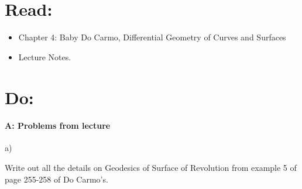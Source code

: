 \documentclass[12pt]{article}
\title{\rightline {\Huge {Due: December, 5}}}
\author{\LARGE {HMC\quad Math 142 \quad Fall 2017} 
\\ {Prof. Gu}  
\\ {\LARGE Problem Set 11}}
\date{Start this assignment before Sunday night!}
\begin{document}
\maketitle

\section*{ Read: } 

\begin{itemize}
\item{Chapter 4: Baby Do Carmo, Differential Geometry of Curves and Surfaces}
\item{Lecture Notes.}
\end{itemize}

\section*{ Do: }

\medskip
\paragraph{A: Problems from lecture}
\begin{itemize}
    {\item a)} Write out all the details on Geodesics of Surface of Revolution from example 5 of page 255-258 of Do Carmo's.
\end{itemize}
\end{document}
